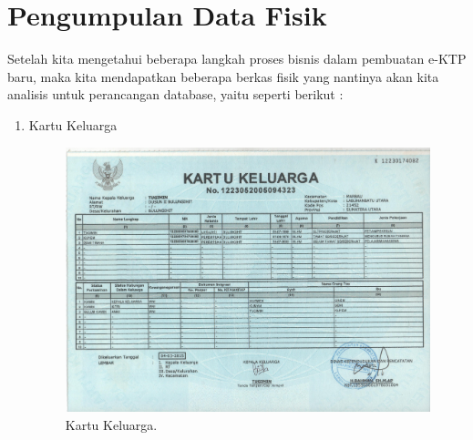 \section{Pengumpulan Data Fisik}
Setelah kita mengetahui beberapa langkah proses bisnis dalam pembuatan e-KTP baru, maka kita mendapatkan beberapa berkas fisik yang nantinya akan kita analisis untuk perancangan database, yaitu seperti berikut : 
\begin{enumerate}

	\item Kartu Keluarga
	\begin{figure}[H]
		\centering
		\includegraphics[width=12cm]{figures/kk.jpg}
		\caption{Kartu Keluarga.}	
	\end{figure}


\end{enumerate}
